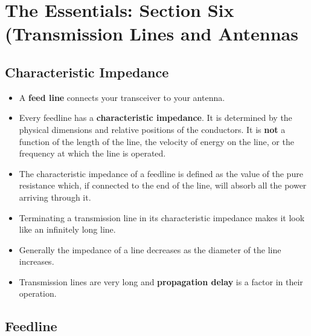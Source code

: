 \documentclass[letterpaper,12pt]{article}
\begin{document}

\section{The Essentials: Section Six (Transmission Lines and Antennas}

\subsection{Characteristic Impedance}

\begin{itemize}
\item A \textbf{feed line} connects your transceiver to your antenna.
\item Every feedline has a \textbf{characteristic impedance}. It is determined by the physical dimensions
and relative positions of the conductors. It is \textbf{not} a function of the length of the line,
the velocity of energy on the line,
or the frequency at which the line is operated.
\item The characteristic impedance of a feedline is defined as the value of the pure resistance which, if connected to the end of the line,
will absorb all the power arriving through it.
\item Terminating a transmission line in its characteristic impedance makes it look like an infinitely long line. 
\item Generally the impedance of a line decreases as the diameter of the line increases.
\item Transmission lines are very long and \textbf{propagation delay} is a factor in their operation.
\end{itemize}

\subsection{Feedline}
\end{document}
